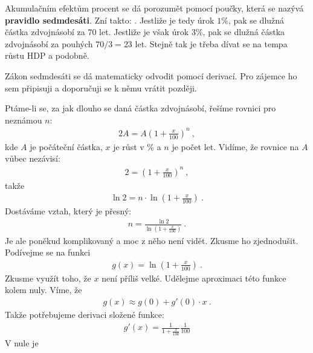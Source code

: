 \begin{example}
    Akumulačním efektům procent se dá porozumět pomocí poučky, která se nazývá \textbf{pravidlo sedmdesáti}. Zní takto: .
    Jestliže je tedy úrok $1\%$, pak se dlužná částka zdvojnásobí za $70$ let. Jestliže je však úrok $3\%$, pak se dlužná částka zdvojnásobí za pouhých $70/3=23$ let. Stejně tak je třeba dívat se na tempa růstu HDP a podobně.
\end{example}
\begin{example}
    Zákon sedmdesáti se dá matematicky odvodit pomocí derivací. Pro zájemce ho sem připisuji a doporučuji se k němu vrátit později.

    Ptáme-li se, za jak dlouho se daná částka zdvojnásobí, řešíme rovnici pro neznámou $n$:
    \begin{align}
        2 A = A  \left( 1+ \frac{x}{100} \right)^n \:,
    \end{align}
    kde $A$ je počáteční částka, $x$ je růst v $\%$ a $n$ je počet let. Vidíme, že rovnice na $A$ vůbec nezávisí:
    \begin{align}
        2 = \left( 1+ \frac{x}{100} \right)^n \:,
    \end{align}
    takže
    \begin{align}
        \ln 2 = n \cdot \ln \left( 1 + \frac{x}{100} \right) \:.
    \end{align}
    Dostáváme vztah, který je přesný:
    \begin{align}
        n = \frac{\ln 2}{\ln \left(1 + \frac{x}{100}\right)} \:.
    \end{align}
    Je ale poněkud komplikovaný a moc z něho není vidět. Zkusme ho zjednodušit.
    Podívejme se na funkci
    \begin{align}
        g(x) = \ln \left(1 + \frac{x}{100}\right) \:.
    \end{align}
    Zkusme využít toho, že $x$ není příliš velké. Udělejme aproximaci této funkce kolem nuly. Víme, že
    \begin{align}
        g(x) \approx g(0) + g'(0) \cdot x \:.
    \end{align}
    Takže potřebujeme derivaci složené funkce:
    \begin{align}
        g'(x) = \frac{1}{1 + \frac{x}{100}} \frac{1}{100}
    \end{align}
    V nule je
    \begin{align}

\end{align}
\end{example}
